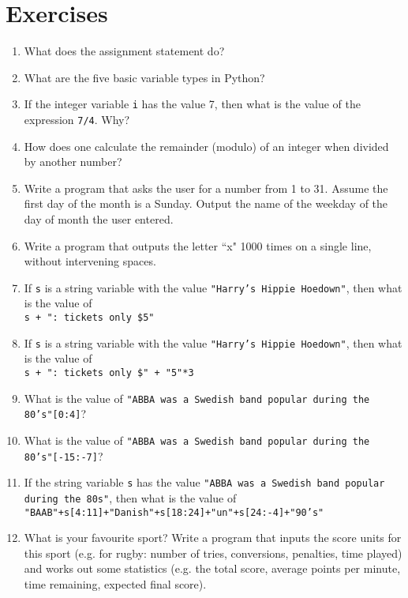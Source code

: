 \section{Exercises}
\begin{enumerate}
	\item What does the assignment statement do?
	\item What are the five basic variable types in Python?
	\item If the integer variable \texttt{i} has the value 7, then what is    the value of the expression 
\texttt{7/4}. Why?
	\item How does one calculate the remainder (modulo) of an integer when    divided by another number?
	\item Write a program that asks the user for a number from 1 to 31.    Assume the first day of the month is a Sunday. Output the name of    the weekday of the day of month the user entered.
	\item Write a program that outputs the letter ``x" 1000 times on a    single line, without intervening spaces.
	\item If \texttt{s} is a string variable with the value \texttt{"Harry's Hippie Hoedown"}, then what is the value of
\\
\texttt{s + ": tickets only    \$5"}
	\item If \texttt{s} is a string variable with the value \texttt{"Harry's Hippie Hoedown"}, then what is the value of
\\
\texttt{s + ": tickets only    \$" + "5"*3}
	\item What is the value of 
\texttt{"ABBA was a Swedish band popular during the    80's"[0:4]}?
	\item What is the value of 
\texttt{"ABBA was a Swedish band popular during the    80's"[-15:-7]}?
	\item If the string variable \texttt{s} has the value \texttt{"ABBA was a    Swedish band popular during the 80s"}, then what is the value of    
\\
\texttt{"BAAB"+s[4:11]+"Danish"+s[18:24]+"un"+s[24:-4]+"90's"}
	\item What is your favourite sport? Write a program that inputs the score       units for this sport (e.g. for rugby: number of tries, conversions,       penalties, time played) and works out some statistics (e.g. the total       score, average points per minute, time remaining, expected final score).    
\end{enumerate} 
